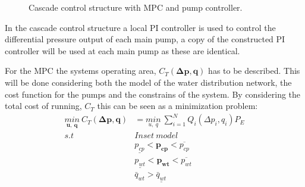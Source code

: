 \begin{figure}[H]
\centering
 
\caption{Cascade control structure with MPC and pump controller.}
\label{fig:control_structure}
\end{figure}

In the cascade control structure a local PI controller is used to control the differential pressure output of each main pump, a copy of the constructed PI controller will be used at each main pump as these are identical.

For the MPC the systems operating area, $C_T(\pmb{\Delta{p}},\pmb{q})$ has to be described. This will be done considering both the model of the water distribution network, the cost function for the pumps and the constrains of the system. By considering the total cost of running, $C_T$ this can be seen as a minimization problem:
\begin{align*}
\underset{\pmb{u}, \:\pmb{q}}{min} \: C_T(\pmb{\Delta{p}},\pmb{q}) &= \underset{u, \:q}{min} \: \sum_{i=1}^{N} Q_i(\Delta{p}_i,q_i) P_E  \\
%
s.t \:\:\:\:\: & Inset \:model \\
%
& \underline{p_{cp}} < \pmb{p_{cp}} < \overline{p_{cp}} \\
%
& \underline{p_{wt}} < \pmb{p_{wt}} < \overline{p_{wt}} \\
%
& \bar{q}_{wt} > \underline{\bar{q}_{wt}}
\end{align*}

